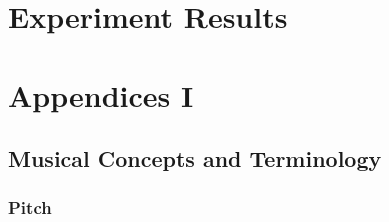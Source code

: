 \appendix

	
\begin{appendices}

\chapter{Experiment Results}




\chapter{Appendices I} \label{app:appendix_one}
\section{Musical Concepts and Terminology} \label{ase:app_one_sect_1}

\subsection{Pitch}


\end{appendices}
